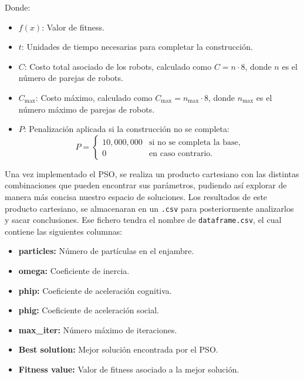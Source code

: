 \documentclass[a4paper,12pt]{article}
\begin{document}
Donde: 
\begin{itemize}
    \item $f(x)$: Valor de fitness.
    \item $t$: Unidades de tiempo necesarias para completar la construcción.
    \item $C$: Costo total asociado de los robots, calculado como $C = n \cdot 8$, donde $n$ es el número de parejas de robots.
    \item $C_\text{max}$: Costo máximo, calculado como $C_\text{max} = n_\text{max} \cdot 8$, donde $n_\text{max}$ es el número máximo de parejas de robots.
    \item $P$: Penalización aplicada si la construcción no se completa:
    \[
    P =
    \begin{cases} 
    10,000,000 & \text{si no se completa la base}, \\
    0 & \text{en caso contrario}.
    \end{cases}
    \]
\end{itemize}

Una vez implementado el PSO, se realiza un producto cartesiano con las distintas combinaciones que pueden encontrar sus parámetros, pudiendo así explorar de manera más concisa nuestro espacio de soluciones. Los resultados de este producto cartesiano, se almacenaran en un \texttt{.csv} para posteriormente analizarlos y sacar conclusiones. Ese fichero tendra el nombre de \texttt{dataframe.csv}, el cual contiene las siguientes columnas:

\begin{itemize}
    \item \textbf{particles:} Número de partículas en el enjambre.
    \item \textbf{omega:} Coeficiente de inercia.
    \item \textbf{phip:} Coeficiente de aceleración cognitiva.
    \item \textbf{phig:} Coeficiente de aceleración social.
    \item \textbf{max\_iter:} Número máximo de iteraciones.
    \item \textbf{Best solution:} Mejor solución encontrada por el PSO.
    \item \textbf{Fitness value:} Valor de fitness asociado a la mejor solución.
\end{itemize}
\end{document}
